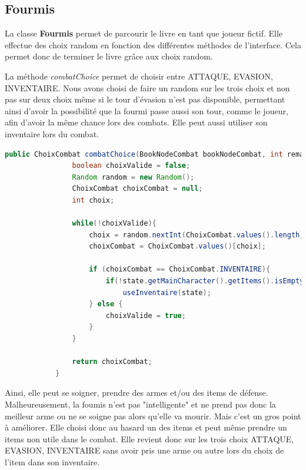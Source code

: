 	\subsection{Fourmis}\label{sub:fourmis}
		La classe \textbf{Fourmis} permet de parcourir le livre en tant que joueur fictif. Elle effectue des choix random en fonction des différentes méthodes de l'interface. Cela permet donc de terminer le livre grâce aux choix random.

		La méthode \textit{combatChoice} permet de choisir entre ATTAQUE, EVASION, INVENTAIRE. Nous avons choisi de faire un random sur les trois choix et non pas sur deux choix même si le tour d'évasion n'est pas disponible, permettant ainsi d'avoir la possibilité que la fourmi passe aussi son tour, comme le joueur, afin d'avoir la même chance lors des combats. Elle peut aussi utiliser son inventaire lors du combat.

		\begin{lstlisting}[gobble=12, language=java, caption=combatChoice() de Fourmis]
			public ChoixCombat combatChoice(BookNodeCombat bookNodeCombat, int remainingRoundBeforeEvasion, BookState state) {
				boolean choixValide = false;
				Random random = new Random();
				ChoixCombat choixCombat = null;
				int choix;

				while(!choixValide){
					choix = random.nextInt(ChoixCombat.values().length);
					choixCombat = ChoixCombat.values()[choix];

					if (choixCombat == ChoixCombat.INVENTAIRE){
						if(!state.getMainCharacter().getItems().isEmpty())
							useInventaire(state);
					} else {
						choixValide = true;
					}
				}

				return choixCombat;
			}
		\end{lstlisting}

		 Ainsi, elle peut se soigner, prendre des armes et/ou des items de défense. Malheureusement, la foumis n'est pas "intelligente" et ne prend pas donc la meilleur arme ou ne se soigne pas alors qu'elle va mourir. Mais c'est un gros point à améliorer. Elle choisi donc au hasard un des items et peut même prendre un items non utile dans le combat. Elle revient donc sur les trois choix ATTAQUE, EVASION, INVENTAIRE sans avoir pris une arme ou autre lors du choix de l'item dans son inventaire.

